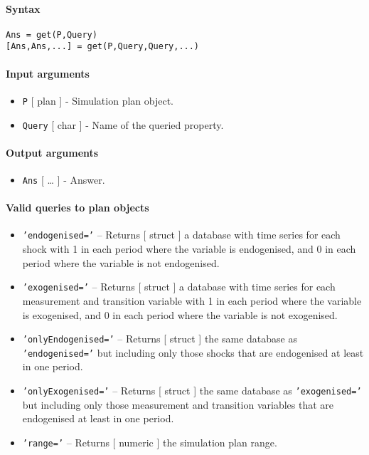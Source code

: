 


	\paragraph{Syntax}\label{syntax}

\begin{verbatim}
Ans = get(P,Query)
[Ans,Ans,...] = get(P,Query,Query,...)
\end{verbatim}

\paragraph{Input arguments}\label{input-arguments}

\begin{itemize}
\item
  \texttt{P} {[} plan {]} - Simulation plan object.
\item
  \texttt{Query} {[} char {]} - Name of the queried property.
\end{itemize}

\paragraph{Output arguments}\label{output-arguments}

\begin{itemize}
\itemsep1pt\parskip0pt
\item
  \texttt{Ans} {[} \ldots{} {]} - Answer.
\end{itemize}

\paragraph{Valid queries to plan
objects}\label{valid-queries-to-plan-objects}

\begin{itemize}
\item
  \texttt{'endogenised='} -- Returns {[} struct {]} a database with time
  series for each shock with 1 in each period where the variable is
  endogenised, and 0 in each period where the variable is not
  endogenised.
\item
  \texttt{'exogenised='} -- Returns {[} struct {]} a database with time
  series for each measurement and transition variable with 1 in each
  period where the variable is exogenised, and 0 in each period where
  the variable is not exogenised.
\item
  \texttt{'onlyEndogenised='} -- Returns {[} struct {]} the same
  database as \texttt{'endogenised='} but including only those shocks
  that are endogenised at least in one period.
\item
  \texttt{'onlyExogenised='} -- Returns {[} struct {]} the same database
  as \texttt{'exogenised='} but including only those measurement and
  transition variables that are endogenised at least in one period.
\item
  \texttt{'range='} -- Returns {[} numeric {]} the simulation plan
  range.
\end{itemize}

